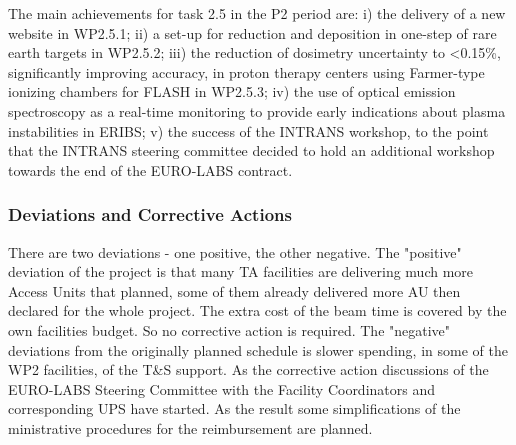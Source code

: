 The main achievements for task 2.5 in the P2 period are: i) the delivery of a new website in WP2.5.1; ii) a set-up for reduction and deposition in one-step of rare earth targets in WP2.5.2; iii) the reduction of dosimetry uncertainty to <0.15\%, significantly improving accuracy, in proton therapy centers using Farmer-type ionizing chambers for FLASH in WP2.5.3; iv) the use of optical emission spectroscopy as a real-time monitoring to provide early indications about plasma instabilities in ERIBS; v) the success of the INTRANS workshop, to the point that the INTRANS steering committee decided to hold an additional workshop towards the end of the EURO-LABS contract.





\subsubsection*{Deviations and Corrective Actions}
\label{sec:wp2-deviations}
There are two deviations - one positive, the other negative. The "positive" deviation of the project is that many TA facilities are delivering much more Access Units that planned, some of them already delivered more AU then declared for the whole project. The extra cost of the beam time is covered by the own facilities budget. So no corrective action is required.
The "negative" deviations from the originally planned schedule is slower spending, in some of the WP2 facilities, of the T\&S support. As the corrective action discussions of the EURO-LABS Steering Committee with the Facility Coordinators and corresponding UPS have started. As the result some simplifications of the ministrative procedures for the reimbursement are planned.  



